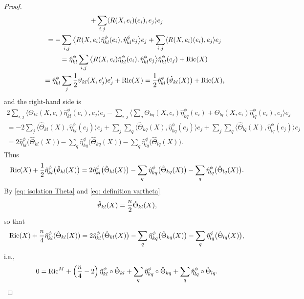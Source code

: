 \documentclass[10pt,a4paper]{amsart}
\numberwithin{equation}{section}
\begin{document}
\begin{proof}
\begin{gather*}
+\sum_{i,j}\langle {R(X,e_i)}(e_i),e_j\rangle e_j\\
\qquad{} =
-\sum_{i,j}\big\langle {R(X,e_i)}\hat{\eta}^\phi_{kl}(e_i),\hat{\eta}^\phi_{kl}e_j\big\rangle e_j +\sum_{i,j}\langle {R(X,e_i)}(e_i),e_j\rangle e_j\\
 \qquad{} =
\hat\eta_{kl}^\phi\sum_{i,j}\big\langle {R(X,e_i)}\hat{\eta}^\phi_{kl}(e_i),\hat{\eta}^\phi_{kl}e_j\big\rangle \hat\eta_{kl}^\phi (e_j)+{\rm Ric}(X)\\
\qquad{} = \hat\eta_{kl}^\phi\sum_{j}{1\over 2}\vartheta_{kl}(X,e_j')e_j'+{\rm Ric}(X)
 =
{1\over 2}\hat\eta_{kl}^\phi\big(\hat\vartheta_{kl}(X)\big)+{\rm Ric}(X) ,
\end{gather*}
and the right-hand side is
\begin{gather*}
 2\sum_{i,j}\big\langle \Theta_{kl}(X,e_i)\hat\eta_{kl}^\phi(e_i),e_j\big\rangle e_j
 -\sum_{i,j}\bigg\langle \sum_{q} \Theta_{kq}(X,e_i) \hat{\eta}^\phi_{kq}(e_i)
 + \Theta_{lq}(X,e_i)\hat{\eta}^\phi_{lq}(e_i),e_j\bigg\rangle e_j\\
{} =
- 2\sum_{j}\big\langle \hat\Theta_{kl}(X),\hat\eta_{kl}^\phi(e_j)\big\rangle e_j
 +\sum_{j}\sum_q\big\langle \hat\Theta_{kq}(X),\hat{\eta}^\phi_{kq}(e_j)\big\rangle e_j
 + \sum_{j}\sum_q\big\langle \hat\Theta_{lq}(X),\hat{\eta}^\phi_{lq}(e_j)\big\rangle e_j\\
{} = 2\hat\eta_{kl}^\phi\big(\hat\Theta_{kl}(X)\big) -\sum_q\hat{\eta}^\phi_{kq}\big(\hat\Theta_{kq}(X)\big)
 - \sum_q\hat{\eta}^\phi_{lq}\big(\hat\Theta_{lq}(X)\big).
\end{gather*}
Thus
\begin{gather*}
{\rm Ric}(X) +{1\over 2}\hat\eta_{kl}^\phi\big(\hat\vartheta_{kl}(X)\big) =
 2\hat\eta_{kl}^\phi\big(\hat\Theta_{kl}(X)\big) -\sum_q\hat{\eta}^\phi_{kq}\big(\hat\Theta_{kq}(X)\big)
 - \sum_q\hat{\eta}^\phi_{lq}\big(\hat\Theta_{lq}(X)\big).
\end{gather*}
By \eqref{eq: isolation Theta} and \eqref{eq: definition vartheta}
\begin{gather*}\hat\vartheta_{kl}(X)={n\over 2}\hat\Theta_{kl}(X),\end{gather*}
so that
\begin{gather*}
{\rm Ric}(X) +{n\over 4}\hat\eta_{kl}^\phi(\hat\Theta_{kl}(X)) =
 2\hat\eta_{kl}^\phi\big(\hat\Theta_{kl}(X)\big) -\sum_q\hat{\eta}^\phi_{kq}\big(\hat\Theta_{kq}(X)\big) - \sum_q\hat{\eta}^\phi_{lq}\big(\hat\Theta_{lq}(X)\big),
\end{gather*}
i.e.,
\begin{gather*}
 0={\rm Ric}^M + \left({n\over 4}-2\right)\hat\eta_{kl}^\phi\circ\hat\Theta_{kl} +\sum_q\hat{\eta}^\phi_{kq}\circ\hat\Theta_{kq} + \sum_q\hat{\eta}^\phi_{lq}\circ\hat\Theta_{lq}.

\end{gather*}
\end{proof}
\end{document}
